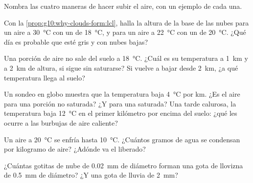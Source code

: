 \begin{exercise}[$\star$]\label{exo:g10:why-clouds-form:5}
Nombra las cuatro maneras de hacer subir el aire, con un ejemplo de cada una.
\end{exercise}

\begin{exercise}[$\star\star$]\label{exo:g10:why-clouds-form:6}
Con la \cref{prop:g10:why-clouds-form:lcl}, halla la altura de la base de
las nubes para un aire a \qty{30}{\degreeCelsius} con un  de
\qty{18}{\degreeCelsius}, y para un aire a \qty{22}{\degreeCelsius} con un
 de \qty{20}{\degreeCelsius}. ¿Qué día es probable que esté
gris y con nubes bajas?
\end{exercise}

\begin{exercise}[$\star\star$]\label{exo:g10:why-clouds-form:7}
Una porción de aire no  sale del suelo a \qty{18}{\degreeCelsius}.
¿Cuál es su temperatura a \qty{1}{km} y a \qty{2}{km} de altura, si sigue
sin saturarse? Si vuelve a bajar desde \qty{2}{km}, ¿a qué temperatura llega
al suelo?
\end{exercise}

\begin{exercise}[$\star\star$]\label{exo:g10:why-clouds-form:8}
Un sondeo en globo muestra que la temperatura baja \qty{4}{\degreeCelsius}
por km. ¿Es  el aire para una porción no saturada? ¿Y para una
saturada? Una tarde calurosa, la temperatura baja \qty{12}{\degreeCelsius} en
el primer kilómetro por encima del suelo: ¿qué les ocurre a las burbujas de
aire caliente?
\end{exercise}

\begin{exercise}[$\star\star$]\label{exo:g10:why-clouds-form:9}
Un aire  a \qty{20}{\degreeCelsius} se enfría hasta
\qty{10}{\degreeCelsius}. ¿Cuántos gramos de agua se condensan por kilogramo
de aire? ¿Adónde va el  liberado?
\end{exercise}

\begin{exercise}[$\star\star$]\label{exo:g10:why-clouds-form:10}
¿Cuántas gotitas de nube de \qty{0.02}{mm} de diámetro forman una gota de
llovizna de \qty{0.5}{mm} de diámetro? ¿Y una gota de lluvia de
\qty{2}{mm}?
\end{exercise}

